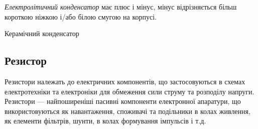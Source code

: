 \documentclass[12pt,a4paper]{book}  %
\begin{document}
\textit{Електролітичний конденсатор} має плюс і мінус, мінус відрізняється більш короткою ніжкою і/або білою смугою на корпусі.

\begin{figure}[h!]
\label{ris:image}
\end{figure}

\begin{figure}[h!]
\end{figure}




Керамічний конденсатор

\begin{figure}[h!]
\label{ris:image}
\end{figure}


\begin{center}
\end{center}

\subsection{Резистор}

Резистори належать до електричних компонентів, що застосовуються в схемах електротехніки та електроніки для обмеження сили струму та розподілу напруги. Резистори — найпоширеніші пасивні компоненти електронної апаратури, що використовуються як навантаження, споживачі та подільники в колах живлення, як елементи фільтрів, шунти, в колах формування імпульсів і т.д. 
\end{document}
